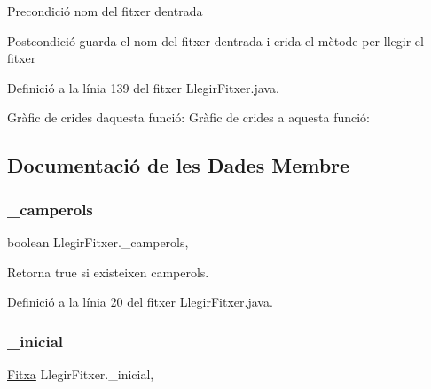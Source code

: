\begin{DoxyPrecond}{Precondició}
nom del fitxer d\textquotesingle{}entrada 
\end{DoxyPrecond}
\begin{DoxyPostcond}{Postcondició}
guarda el nom del fitxer d\textquotesingle{}entrada i crida el mètode per llegir el fitxer 
\end{DoxyPostcond}


Definició a la línia 139 del fitxer Llegir\+Fitxer.\+java.

Gràfic de crides d\textquotesingle{}aquesta funció\+:
Gràfic de crides a aquesta funció\+:


\subsection{Documentació de les Dades Membre}
\mbox{\label{class_llegir_fitxer_a1f155a3c0d9f6df5866f37e2f6e0dd9f}} 
\subsubsection{\texorpdfstring{\+\_\+camperols}{\_camperols}}
{\footnotesize\ttfamily boolean Llegir\+Fitxer.\+\_\+camperols\hspace{0.3cm}{\ttfamily [static]}, {\ttfamily [private]}}



Retorna true si existeixen camperols. 



Definició a la línia 20 del fitxer Llegir\+Fitxer.\+java.

\mbox{\label{class_llegir_fitxer_a6e734852134240534b6fd54eb263eaf5}} 
\subsubsection{\texorpdfstring{\+\_\+inicial}{\_inicial}}
{\footnotesize\ttfamily \mbox{\hyperlink{class_fitxa}{Fitxa}} Llegir\+Fitxer.\+\_\+inicial\hspace{0.3cm}{\ttfamily [static]}, {\ttfamily [private]}}



